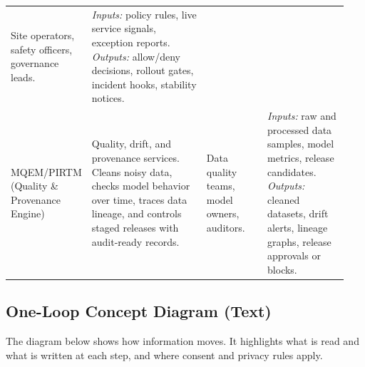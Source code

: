 \documentclass[12pt]{article}
\begin{document}
\begin{longtable}{@{}p{0.18\linewidth}p{0.34\linewidth}p{0.18\linewidth}p{0.24\linewidth}@{}}
Site operators, safety officers, governance leads. &
\emph{Inputs:} policy rules, live service signals, exception reports. \newline
\emph{Outputs:} allow/deny decisions, rollout gates, incident hooks, stability notices. \\
\addlinespace
MQEM/PIRTM (Quality \& Provenance Engine) &
Quality, drift, and provenance services. Cleans noisy data, checks model behavior over time, traces data lineage, and controls staged releases with audit-ready records. &
Data quality teams, model owners, auditors. &
\emph{Inputs:} raw and processed data samples, model metrics, release candidates. \newline
\emph{Outputs:} cleaned datasets, drift alerts, lineage graphs, release approvals or blocks. \\
\bottomrule
\end{longtable}

\subsection*{One-Loop Concept Diagram (Text)}
The diagram below shows how information moves. It highlights what is read and what is written at each step, and where consent and privacy rules apply.
\end{document}
